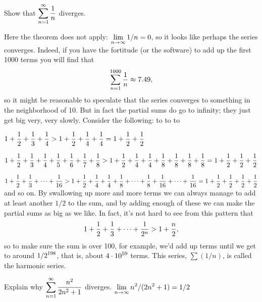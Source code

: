 \example
Show that $\displaystyle\sum_{n=1}^\infty {1\over n}$ diverges.
\par\nobreak\ssk\noindent
Here the theorem does not apply: $\displaystyle\lim _{n\to\infty} 1/n=0$, so it
looks like perhaps the series converges. Indeed, if you have the
fortitude (or the software) to add up the first 1000 terms you will find that
$$\sum_{n=1}^{1000} {1\over n}\approx 7.49,$$
so it might be reasonable to speculate that the series converges to
something in the neighborhood of 10. But in fact the partial sums do go
to infinity; they just get big very, very slowly. Consider the
following:
\texonly
\msk
\hbox to 
\msk
\hbox to 
\msk
\hbox to 
\endtexonly
\htmlonly

$\displaystyle 1+{1\over 2}+{1\over 3}+{1\over 4} > 
1+{1\over 2}+{1\over 4}+{1\over
  4} = 1+{1\over 2}+{1\over 2}$

$\displaystyle 1+{1\over 2}+{1\over 3}+{1\over 4}+
{1\over 5}+{1\over 6}+{1\over
    7}+{1\over 8} > 
1+{1\over 2}+{1\over 4}+{1\over 4}+{1\over 8}+{1\over 8}+{1\over
    8}+{1\over 8} = 1+{1\over 2}+{1\over 2}+{1\over 2}$

$\displaystyle 1+{1\over 2}+{1\over 3}+\cdots+{1\over16}>
1+{1\over 2}+{1\over 4}+{1\over 4}+{1\over 8}+\cdots+{1\over
  8}+{1\over16}+\cdots +{1\over16} =1+{1\over 2}+{1\over 2}+{1\over
  2}+{1\over 2}$
\endhtmlonly
\msk\noindent
and so on. By swallowing up more and more terms we can always manage
to add at least another $1/2$ to the sum, and by adding enough of
these we can make the partial sums as big as we like. In fact, it's
not hard to see from this pattern that
$$1+{1\over 2}+{1\over 3}+\cdots+{1\over 2^n} > 1+{n\over 2},$$
so to make sure the sum is over 100, for example, we'd add
up terms until we get to around $\displaystyle 1/2^{198}$, that is,
about $\displaystyle 4\cdot 10^{59}$ terms. This series, $\sum (1/n)$, is called the
{\dfont harmonic series\/}.
\endexample

\exercises

\exercise Explain why $\displaystyle\sum_{n=1}^\infty {n^2\over 2n^2+1}$
diverges.
\answer $\displaystyle\lim_{n\to\infty} n^2/(2n^2+1)=1/2$
\endanswer
\endexercise

